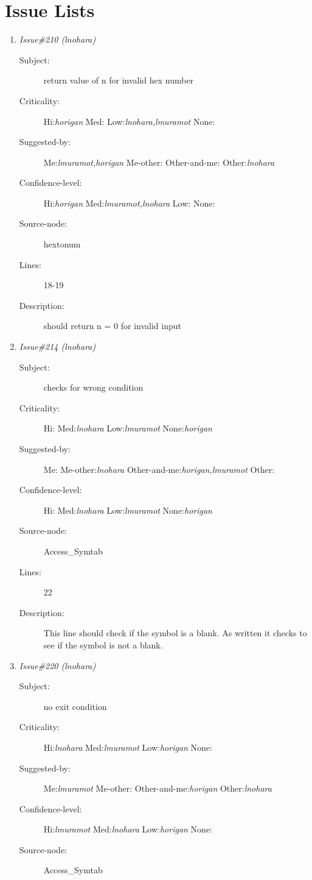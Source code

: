 \section{Issue Lists}
\begin{enumerate}
\item {\it Issue\#210 (lnohara)}
\begin{description}
\item [Subject:] return value of n for invalid hex number
\item [Criticality:] Hi:{\it horigan} Med:{\it } Low:{\it lnohara,lmuramot} None:{\it }
\item [Suggested-by:] Me:{\it lmuramot,horigan} Me-other:{\it } Other-and-me:{\it } Other:{\it lnohara}
\item [Confidence-level:] Hi:{\it horigan} Med:{\it lmuramot,lnohara} Low:{\it } None:{\it }
\item [Source-node:] hextonum

\item [Lines:] 18-19

\item [Description:] should return n = 0 for invalid input
\end{description}
\item {\it Issue\#214 (lnohara)}
\begin{description}
\item [Subject:] checks for wrong condition
\item [Criticality:] Hi:{\it } Med:{\it lnohara} Low:{\it lmuramot} None:{\it horigan}
\item [Suggested-by:] Me:{\it } Me-other:{\it lnohara} Other-and-me:{\it horigan,lmuramot} Other:{\it }
\item [Confidence-level:] Hi:{\it } Med:{\it lnohara} Low:{\it lmuramot} None:{\it horigan}
\item [Source-node:] Access\_Symtab

\item [Lines:] 22

\item [Description:] This line should check if the symbol is a
blank.  As written it checks to see if the symbol is not a blank.
\end{description}
\item {\it Issue\#220 (lnohara)}
\begin{description}
\item [Subject:] no exit condition
\item [Criticality:] Hi:{\it lnohara} Med:{\it lmuramot} Low:{\it horigan} None:{\it }
\item [Suggested-by:] Me:{\it lmuramot} Me-other:{\it } Other-and-me:{\it horigan} Other:{\it lnohara}
\item [Confidence-level:] Hi:{\it lmuramot} Med:{\it lnohara} Low:{\it horigan} None:{\it }
\item [Source-node:] Access\_Symtab


\end{description}
\end{enumerate}

